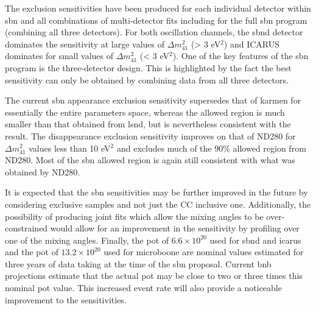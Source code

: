 The exclusion sensitivities have been produced for each individual detector within \gls{sbn} and all combinations of multi-detector fits including for the full \gls{sbn} program (combining all three detectors). For both oscillation channels, the \gls{sbnd} detector dominates the sensitivity at large values of $\Delta m^2_{41}$ (> 3 eV$^2$) and ICARUS dominates for small values of $\Delta m^2_{41}$ (< 3 eV$^2$). One of the key features of the \gls{sbn} program is the three-detector design. This is highlighted by the fact the best sensitivity can only be obtained by combining data from all three detectors. 

The current \gls{sbn} \nue appearance exclusion sensitivity supersedes that of \gls{karmen} for essentially the entire parameters space, whereas the allowed region is much smaller than that obtained from \gls{lsnd}, but is nevertheless consistent with the result. The \nue disappearance exclusion sensitivity improves on that of ND280 for $\Delta m^2_{41}$ values less than 10 eV$^2$ and excludes much of the 90\% allowed region from ND280. Most of the \gls{sbn} allowed region is again still consistent with what was obtained by ND280. 

It is expected that the \gls{sbn} sensitivities may be further improved in the future by considering exclusive samples and not just the \nue CC inclusive one. Additionally, the possibility of producing joint fits which allow the mixing angles to be over-constrained would allow for an improvement in the sensitivity by profiling over one of the mixing angles. Finally, the \gls{pot} of $6.6 \times 10^{20}$ used for \gls{sbnd} and \gls{icarus} and the \gls{pot} of $13.2 \times 10^{20}$ used for \gls{microboone} are nominal values estimated for three years of data taking at the time of the \gls{sbn} proposal. Current \gls{bnb} projections estimate that the actual \gls{pot} may be close to two or three times this nominal \gls{pot} value. This increased event rate will also provide a noticeable improvement to the sensitivities. 



